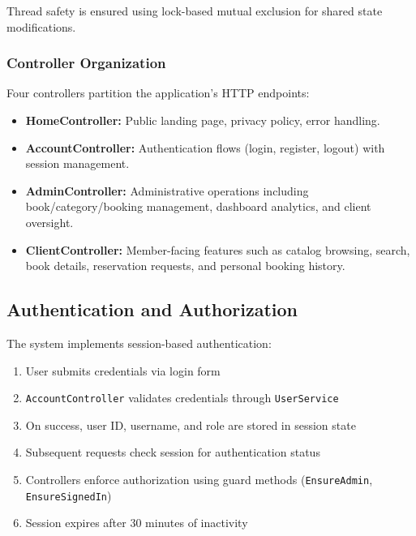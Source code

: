 \documentclass[12pt,a4paper]{article}
\begin{document}
Thread safety is ensured using lock-based mutual exclusion for shared state modifications.

\subsubsection{Controller Organization}

Four controllers partition the application's HTTP endpoints:

\begin{itemize}[leftmargin=*]
    \item \textbf{HomeController:} Public landing page, privacy policy, error handling.
    
    \item \textbf{AccountController:} Authentication flows (login, register, logout) with session management.
    
    \item \textbf{AdminController:} Administrative operations including book/category/booking management, dashboard analytics, and client oversight.
    
    \item \textbf{ClientController:} Member-facing features such as catalog browsing, search, book details, reservation requests, and personal booking history.
\end{itemize}

\subsection{Authentication and Authorization}

The system implements session-based authentication:

\begin{enumerate}[leftmargin=*]
    \item User submits credentials via login form
    \item \texttt{AccountController} validates credentials through \texttt{UserService}
    \item On success, user ID, username, and role are stored in session state
    \item Subsequent requests check session for authentication status
    \item Controllers enforce authorization using guard methods (\texttt{EnsureAdmin}, \texttt{EnsureSignedIn})
    \item Session expires after 30 minutes of inactivity
\end{enumerate}
\end{document}
